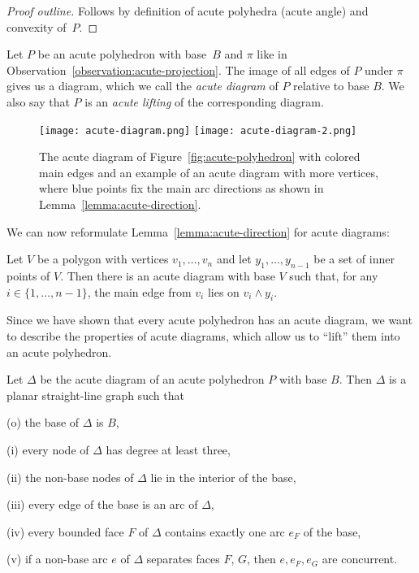 \begin{proof}[Proof outline]
  Follows by definition of acute polyhedra (acute angle) and convexity of~$P$.
\end{proof}

\begin{definition}
  Let $P$ be an acute polyhedron with base~$B$ and $\pi$ like in Observation~\ref{observation:acute-projection}.
  The image of all edges of $P$ under $\pi$ gives us a diagram, which we call the \emph{acute diagram} of $P$ relative to base $B$.
  We also say that $P$ is an \emph{acute lifting} of the corresponding diagram.
\end{definition}

\begin{figure}[ht]
  \centering
  \texttt{[image: acute-diagram.png]}
  \hspace*{5mm}
  \texttt{[image: acute-diagram-2.png]}
  \caption{The acute diagram of Figure~\ref{fig:acute-polyhedron} with colored main edges and an example of an acute diagram with more vertices, where blue points fix the main arc directions as shown in Lemma~\ref{lemma:acute-direction}.}
  \label{fig:acute-diagram}
\end{figure}

We can now reformulate Lemma~\ref{lemma:acute-direction} for acute diagrams:

\begin{corollary}\label{corollary:acute-direction}
  Let $V$ be a polygon with vertices $v_1,\dots,v_n$ and let $y_1,\dots,y_{n-1}$ be a set of inner points of $V$.
  Then there is an acute diagram with base $V$ such that, for any $i \in \{1,\dots,n-1\}$, the main edge from $v_i$ lies on $v_i \wedge y_i$.
\end{corollary}

Since we have shown that every acute polyhedron has an acute diagram, we want to describe the properties of acute diagrams, which allow us to ``lift'' them into an acute polyhedron.

\begin{lemma}\label{lemma:diagram-properties}
  Let $\Delta$ be the acute diagram of an acute polyhedron $P$ with base $B$.
  Then $\Delta$ is a planar straight-line graph such that

  (o) the base of $\Delta$ is $B$,

  (i) every node of $\Delta$ has degree at least three,

  (ii) the non-base nodes of $\Delta$ lie in the interior of the base,

  (iii) every edge of the base is an arc of $\Delta$,

  (iv) every bounded face $F$ of $\Delta$ contains exactly one arc $e_F$ of the base,

  (v) if a non-base arc $e$ of $\Delta$ separates faces $F$, $G$, then $e, e_F, e_G$ are concurrent.
\end{lemma}

